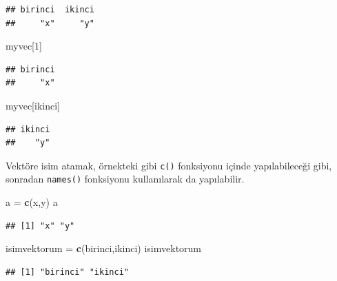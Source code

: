 \documentclass[
]{book}
\newenvironment{Shaded}{\begin{snugshade}}{\end{snugshade}}
\newcommand{\DecValTok}[1]{\textcolor[rgb]{0.00,0.00,0.81}{#1}}
\newcommand{\KeywordTok}[1]{\textcolor[rgb]{0.13,0.29,0.53}{\textbf{#1}}}
\newcommand{\NormalTok}[1]{#1}
\newcommand{\StringTok}[1]{\textcolor[rgb]{0.31,0.60,0.02}{#1}}
\begin{document}
\begin{verbatim}
## birinci  ikinci 
##     "x"     "y"
\end{verbatim}

\begin{Shaded}
\begin{Highlighting}[]
\NormalTok{myvec[}\DecValTok{1}\NormalTok{]}
\end{Highlighting}
\end{Shaded}

\begin{verbatim}
## birinci 
##     "x"
\end{verbatim}

\begin{Shaded}
\begin{Highlighting}[]
\NormalTok{myvec[}\StringTok{\textquotesingle{}ikinci\textquotesingle{}}\NormalTok{]}
\end{Highlighting}
\end{Shaded}

\begin{verbatim}
## ikinci 
##    "y"
\end{verbatim}

Vektöre isim atamak, örnekteki gibi \texttt{c()} fonksiyonu içinde yapılabileceği gibi, sonradan \texttt{names()} fonksiyonu kullanılarak da yapılabilir.

\begin{Shaded}
\begin{Highlighting}[]
\NormalTok{a =}\StringTok{ }\KeywordTok{c}\NormalTok{(}\StringTok{\textquotesingle{}x\textquotesingle{}}\NormalTok{,}\StringTok{\textquotesingle{}y\textquotesingle{}}\NormalTok{)}
\NormalTok{a}
\end{Highlighting}
\end{Shaded}

\begin{verbatim}
## [1] "x" "y"
\end{verbatim}

\begin{Shaded}
\begin{Highlighting}[]
\NormalTok{isimvektorum =}\StringTok{ }\KeywordTok{c}\NormalTok{(}\StringTok{\textquotesingle{}birinci\textquotesingle{}}\NormalTok{,}\StringTok{\textquotesingle{}ikinci\textquotesingle{}}\NormalTok{)}
\NormalTok{isimvektorum}
\end{Highlighting}
\end{Shaded}

\begin{verbatim}
## [1] "birinci" "ikinci"
\end{verbatim}
\end{document}
